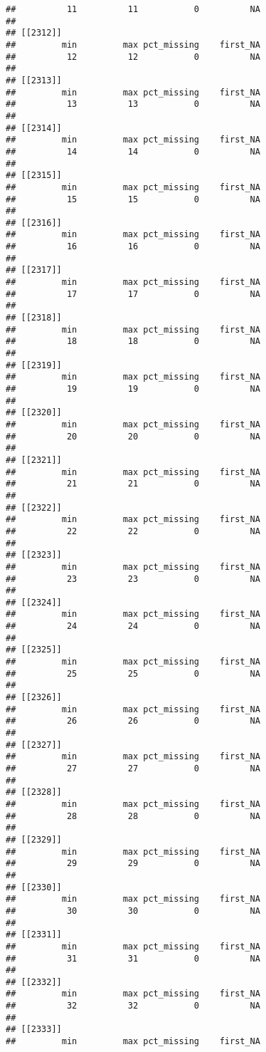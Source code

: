\documentclass[
]{article}
\begin{document}
\begin{verbatim}
##          11          11           0          NA 
## 
## [[2312]]
##         min         max pct_missing    first_NA 
##          12          12           0          NA 
## 
## [[2313]]
##         min         max pct_missing    first_NA 
##          13          13           0          NA 
## 
## [[2314]]
##         min         max pct_missing    first_NA 
##          14          14           0          NA 
## 
## [[2315]]
##         min         max pct_missing    first_NA 
##          15          15           0          NA 
## 
## [[2316]]
##         min         max pct_missing    first_NA 
##          16          16           0          NA 
## 
## [[2317]]
##         min         max pct_missing    first_NA 
##          17          17           0          NA 
## 
## [[2318]]
##         min         max pct_missing    first_NA 
##          18          18           0          NA 
## 
## [[2319]]
##         min         max pct_missing    first_NA 
##          19          19           0          NA 
## 
## [[2320]]
##         min         max pct_missing    first_NA 
##          20          20           0          NA 
## 
## [[2321]]
##         min         max pct_missing    first_NA 
##          21          21           0          NA 
## 
## [[2322]]
##         min         max pct_missing    first_NA 
##          22          22           0          NA 
## 
## [[2323]]
##         min         max pct_missing    first_NA 
##          23          23           0          NA 
## 
## [[2324]]
##         min         max pct_missing    first_NA 
##          24          24           0          NA 
## 
## [[2325]]
##         min         max pct_missing    first_NA 
##          25          25           0          NA 
## 
## [[2326]]
##         min         max pct_missing    first_NA 
##          26          26           0          NA 
## 
## [[2327]]
##         min         max pct_missing    first_NA 
##          27          27           0          NA 
## 
## [[2328]]
##         min         max pct_missing    first_NA 
##          28          28           0          NA 
## 
## [[2329]]
##         min         max pct_missing    first_NA 
##          29          29           0          NA 
## 
## [[2330]]
##         min         max pct_missing    first_NA 
##          30          30           0          NA 
## 
## [[2331]]
##         min         max pct_missing    first_NA 
##          31          31           0          NA 
## 
## [[2332]]
##         min         max pct_missing    first_NA 
##          32          32           0          NA 
## 
## [[2333]]
##         min         max pct_missing    first_NA 

\end{verbatim}
\end{document}
